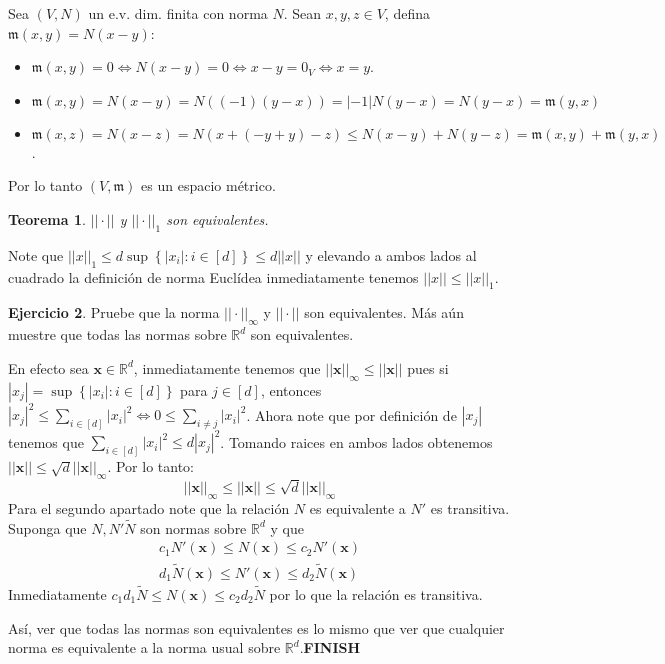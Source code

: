 \documentclass[12pt]{article}
\theoremstyle{plain}
\newtheorem{Th}{Teorema}[subsection]   %
\theoremstyle{definition}
\newtheorem{Ej}[Th]{Ejercicio}
\theoremstyle{remark}
\numberwithin{equation}{section}
\newcommand{\bR}{\mathbb{R}}        %
\newcommand{\mm}{\mathfrak{m}}      %
\renewcommand{\leq}{\leqslant}      %
\renewcommand{\:}{\colon}           %
\renewcommand{\vec}[1]{\mathbf{#1}}
\newcommand{\vx}{\vec{x}}           %
\newcommand{\conj}[1]{\left\lbrace#1\right\rbrace}
\newcommand{\bonj}[1]{\left\lbrack#1\right\rbrack}
\begin{document}
\begin{multicols}{2}
\begin{ptcbp}
Sea $(V,N)$ un e.v. dim. finita con norma $N$.  Sean $x,y,z\in V$, defina $\mm(x,y)=N(x-y)$:
\begin{itemize}
  \item $\mm(x,y)=0\iff N(x-y)=0\iff x-y=0_V\iff x=y$.

  \item $\mm(x,y)=N(x-y)=N((-1)(y-x))=|-1|N(y-x)=N(y-x)=\mm(y,x)$
   \item $\mm(x,z)=N(x-z)=N(x+(-y+y)-z)\leq N(x-y)+N(y-z)=\mm(x,y)+\mm(y,x)$.
\end{itemize}
Por lo tanto $(V,\mm)$ es un espacio métrico.
\end{ptcbp}

\begin{Th}
  $||\cdot||$ y $||\cdot||_1$ son equivalentes.
\end{Th}
\begin{ptcbp}

Note que $||x||_1\leq d\sup\conj{|x_i|\colon i\in\bonj{d}}\leq d||x||$ y elevando a ambos lados al cuadrado la definición de norma Euclídea inmediatamente tenemos $||x||\leq ||x||_1$.

\end{ptcbp}

\begin{Ej}
  Pruebe que la norma $||\cdot||_\infty$ y $||\cdot||$ son equivalentes. Más aún muestre que todas las normas sobre $\bR^d$ son equivalentes.
\end{Ej}

\begin{ptcb}
En efecto sea $\vx\in\bR^d$, inmediatamente tenemos que $||\vx||_\infty\leq ||\vx||$ pues si $|x_j|=\sup\conj{|x_i|\colon i\in\bonj{d}}$ para $j\in\bonj{d}$, entonces $|x_j|^2\leq\sum_{i\in\bonj{d}}|x_i|^2\iff 0\leq \sum_{i\neq j}|x_i|^2$. Ahora note que por definición de $|x_j|$ tenemos que $\sum_{i\in\bonj{d}}|x_i|^2\leq d|x_j|^2$. Tomando raices en ambos lados obtenemos $||\vx||\leq \sqrt{d}||\vx||_\infty$. Por lo tanto:
$$||\vx||_\infty\leq ||\vx||\leq \sqrt{d}||\vx||_\infty$$
Para el segundo apartado note que la relación $N$ es equivalente a $N'$ es transitiva. Suponga que $N,N'\widetilde{N}$ son normas sobre $\bR^d$ y que
\begin{gather*}
  c_1N'(\vx)\leq N(\vx)\leq c_2N'(\vx)\\
  d_1\widetilde{N}(\vx)\leq N'(\vx)\leq d_2\widetilde{N}(\vx)
\end{gather*}
Inmediatamente $c_1d_1\widetilde{N}\leq N(\vx)\leq c_2d_2\widetilde{N}$ por lo que la relación es transitiva.\par
Así, ver que todas las normas son equivalentes es lo mismo que ver que cualquier norma es equivalente a la norma usual sobre $\bR^d$.\textbf{FINISH}
\end{ptcb}


\end{multicols}
\end{document}
